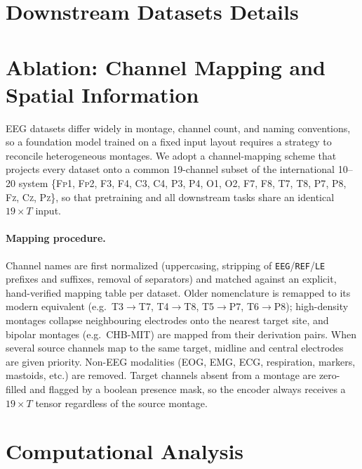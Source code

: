 \documentclass{article}
\begin{document}
\section{Downstream Datasets Details}
\label{app:downstream_datasets}



\section{Ablation: Channel Mapping and Spatial Information}
\label{app:channel_ablation}

EEG datasets differ widely in montage, channel count, and naming conventions, so a foundation model trained on a fixed input layout requires a strategy to reconcile heterogeneous montages.
We adopt a channel-mapping scheme that projects every dataset onto a common 19-channel subset of the international 10--20 system \{\textsc{Fp1}, \textsc{Fp2}, \textsc{F3}, \textsc{F4}, \textsc{C3}, \textsc{C4}, \textsc{P3}, \textsc{P4}, \textsc{O1}, \textsc{O2}, \textsc{F7}, \textsc{F8}, \textsc{T7}, \textsc{T8}, \textsc{P7}, \textsc{P8}, \textsc{Fz}, \textsc{Cz}, \textsc{Pz}\}, so that pretraining and all downstream tasks share an identical $19 \times T$ input.

\paragraph{Mapping procedure.}
Channel names are first normalized (uppercasing, stripping of \texttt{EEG}/\texttt{REF}/\texttt{LE} prefixes and suffixes, removal of separators) and matched against an explicit, hand-verified mapping table per dataset.
Older nomenclature is remapped to its modern equivalent (e.g.\ \textsc{T3}$\to$\textsc{T7}, \textsc{T4}$\to$\textsc{T8}, \textsc{T5}$\to$\textsc{P7}, \textsc{T6}$\to$\textsc{P8}); high-density montages collapse neighbouring electrodes onto the nearest target site, and bipolar montages (e.g.\ CHB-MIT) are mapped from their derivation pairs.
When several source channels map to the same target, midline and central electrodes are given priority.
Non-EEG modalities (EOG, EMG, ECG, respiration, markers, mastoids, etc.) are removed.
Target channels absent from a montage are zero-filled and flagged by a boolean presence mask, so the encoder always receives a $19 \times T$ tensor regardless of the source montage.



\section{Computational Analysis}
\end{document}

